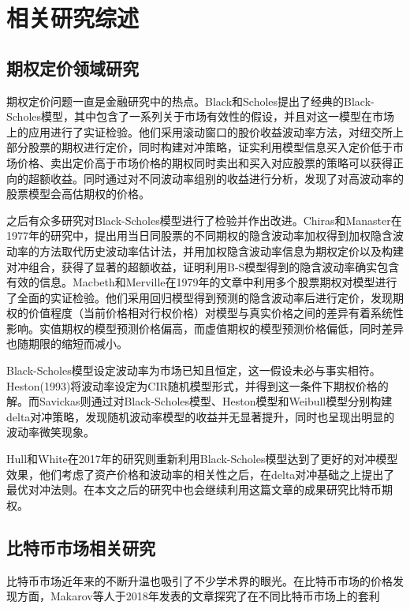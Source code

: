 \chapter{相关研究综述}
\section{期权定价领域研究}
\par{
期权定价问题一直是金融研究中的热点。Black和Scholes提出了经典的Black-Scholes模型\cite{10.2307/1831029}，其中包含了一系列关于市场有效性的假设，并且对这一模型在市场上的应用进行了实证检验\cite{J-1972}。他们采用滚动窗口的股价收益波动率方法，对纽交所上部分股票的期权进行定价，同时构建对冲策略，证实利用模型信息买入定价低于市场价格、卖出定价高于市场价格的期权同时卖出和买入对应股票的策略可以获得正向的超额收益。同时通过对不同波动率组别的收益进行分析，发现了对高波动率的股票模型会高估期权的价格。}
\par{
之后有众多研究对Black-Scholes模型进行了检验并作出改进。Chiras和Manaster在1977年的研究中，提出用当日同股票的不同期权的隐含波动率加权得到加权隐含波动率的方法取代历史波动率估计法，并用加权隐含波动率信息为期权定价以及构建对冲组合，获得了显著的超额收益，证明利用B-S模型得到的隐含波动率确实包含有效的信息\cite{CHIRAS1978213}。Macbeth和Merville在1979年的文章中利用多个股票期权对模型进行了全面的实证检验\cite{Jame-1979}。他们采用回归模型得到预测的隐含波动率后进行定价，发现期权的价值程度（当前价格相对行权价格）对模型与真实价格之间的差异有着系统性影响。实值期权的模型预测价格偏高，而虚值期权的模型预测价格偏低，同时差异也随期限的缩短而减小。
}
\par{Black-Scholes模型设定波动率为市场已知且恒定，这一假设未必与事实相符。Heston(1993)将波动率设定为CIR随机模型形式，并得到这一条件下期权价格的解\cite{10.1093/rfs/6.2.327}。而Savickas则通过对Black-Scholes模型、Heston模型和Weibull模型分别构建delta对冲策略，发现随机波动率模型的收益并无显著提升，同时也呈现出明显的波动率微笑现象\cite{Rober-2005}。}
\par{
    Hull和White在2017年的研究则重新利用Black-Scholes模型达到了更好的对冲模型效果，他们考虑了资产价格和波动率的相关性之后，在delta对冲基础之上提出了最优对冲法则\cite{Hull-2017}。在本文之后的研究中也会继续利用这篇文章的成果研究比特币期权。
}
\section{比特币市场相关研究}
\par{比特币市场近年来的不断升温也吸引了不少学术界的眼光。在比特币市场的价格发现方面，Makarov等人于2018年发表的文章探究了在不同比特币市场上的套利}